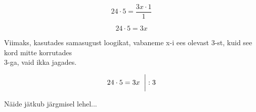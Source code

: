 \begin{center}
{{{\begin{flushleft}
\begin{equation}
\label{eq13_9}
24 \cdot 5 = \dfrac{3x \cdot 1}{1} 
\end{equation}

\begin{equation}
\label{eq13_10}
24 \cdot 5 = 3x
\end{equation}

\hspace{5mm}
Viimaks, kasutades samasugust loogikat, vabaneme x-i ees olevast 3-st, kuid see kord mitte korrutades\\ \hspace{5mm} 3-ga, vaid ikka jagades.

\begin{equation}
\label{eq13_11}
24 \cdot 5 = 3x \hspace{2mm} \bigg| : 3
\end{equation}

\hspace{5mm} Näide jätkub järgmisel lehel...

\end{flushleft}
}}}
\end{center}




